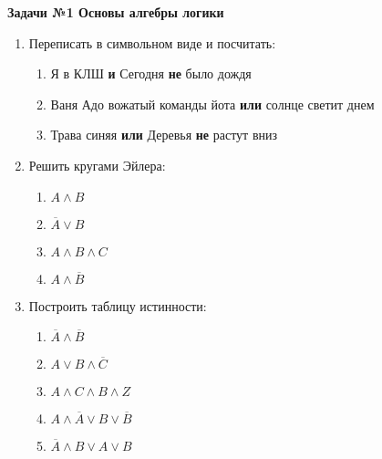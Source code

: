 



    \begin{center}
        \textbf{Задачи №1 Основы алгебры логики}
    \end{center}

    \begin{enumerate}
        \item Переписать в символьном виде и посчитать:
        \begin{enumerate}
            \item Я в КЛШ \textbf{и} Сегодня \textbf{не} было дождя
            \item Ваня Адо вожатый команды йота \textbf{или} солнце светит днем
            \item Трава синяя \textbf{или} Деревья \textbf{не} растут вниз
        \end{enumerate}

        \item Решить кругами Эйлера:
        \begin{enumerate}
            \item $A \wedge B$
            \item $\overline A \vee B$
            \item $A \wedge B \wedge C$
            \item $A \wedge \overline B$
        \end{enumerate}

        \item Построить таблицу истинности:
        \begin{enumerate}
            \item $\overline A \wedge \overline B$
            \item $A \vee B \wedge \overline C$
            \item $A \wedge C \wedge B \wedge Z$
            \item $A \wedge \overline A \vee B \vee \overline B$
            \item $\overline A \wedge B \vee A \vee B$
        \end{enumerate}
    \end{enumerate}


